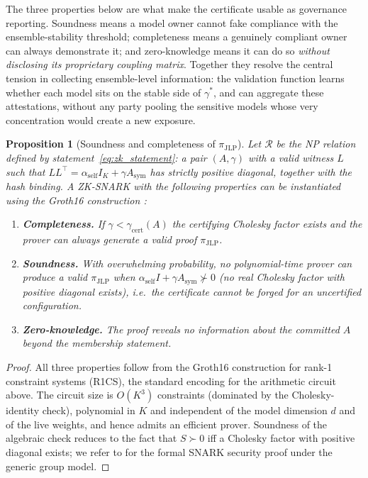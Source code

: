 \documentclass[12pt]{article}
\theoremstyle{plain}
\newtheorem{proposition}[theorem]{Proposition}
\theoremstyle{definition}
\begin{document}
The three properties below are what make the certificate usable as governance reporting. Soundness means a model owner cannot fake compliance with the ensemble-stability threshold; completeness means a genuinely compliant owner can always demonstrate it; and zero-knowledge means it can do so \emph{without disclosing its proprietary coupling matrix}. Together they resolve the central tension in collecting ensemble-level information: the validation function learns whether each model sits on the stable side of $\gamma^*$, and can aggregate these attestations, without any party pooling the sensitive models whose very concentration would create a new exposure.

\begin{proposition}[Soundness and completeness of $\pi_{\mathrm{JLP}}$]
  \label{prop:zk}
  Let $\mathcal{R}$ be the NP relation defined by
  statement~\eqref{eq:zk_statement}: a pair $(A,\gamma)$ with a valid
  witness $L$ such that $LL^\top=\alpha_{\mathrm{self}}I_K+\gamma A_{\mathrm{sym}}$
  has strictly positive diagonal, together with the hash binding.  A
  ZK-SNARK with the following properties can be instantiated using the
  Groth16 construction \cite{groth2016size}:
  \begin{enumerate}[label=(\roman*)]
    \item \textbf{Completeness.} If $\gamma<\gamma_{\mathrm{cert}}(A)$ the
      certifying Cholesky factor exists and the prover can always generate a
      valid proof $\pi_{\mathrm{JLP}}$.
    \item \textbf{Soundness.} With overwhelming probability, no
      polynomial-time prover can produce a valid $\pi_{\mathrm{JLP}}$ when
      $\alpha_{\mathrm{self}}I+\gamma A_{\mathrm{sym}}\not\succ0$ (no real
      Cholesky factor with positive diagonal exists), i.e.\ the certificate
      cannot be forged for an uncertified configuration.
    \item \textbf{Zero-knowledge.} The proof reveals no information about
      the committed $A$ beyond the membership statement.
  \end{enumerate}
\end{proposition}

\begin{proof}
  All three properties follow from the Groth16 construction for rank-1
  constraint systems (R1CS), the standard encoding for the arithmetic
  circuit above.  The circuit size is $O(K^3)$ constraints (dominated by the
  Cholesky-identity check), polynomial in $K$ and independent of the model
  dimension $d$ and of the live weights, and hence admits an efficient
  prover.  Soundness of the algebraic check reduces to the fact that
  $S\succ0$ iff a Cholesky factor with positive diagonal exists; we refer to
  \cite{groth2016size} for the formal SNARK security proof under the generic
  group model.
\end{proof}
\end{document}
